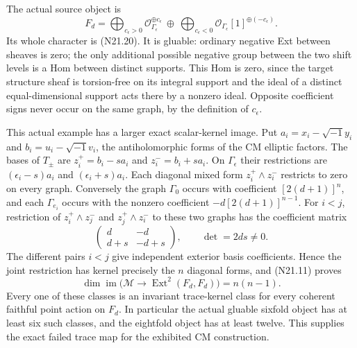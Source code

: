 The actual source object is
\[
 F_d=
 \bigoplus_{c_\epsilon>0}
       \mathcal O_{\Gamma_\epsilon}^{\oplus c_\epsilon}
 \ \oplus\
 \bigoplus_{c_\epsilon<0}
       \mathcal O_{\Gamma_\epsilon}[1]^{\oplus(-c_\epsilon)}.
                                                               \tag{N21.21}
\]
Its whole character is (N21.20). It is gluable:
ordinary negative Ext between sheaves is zero; the only
additional possible negative group between the two shift
levels is a Hom between distinct supports. This Hom is
zero, since the target structure sheaf is torsion-free
on its integral support and the ideal of a distinct
equal-dimensional support acts there by a nonzero ideal.
Opposite coefficient signs never occur on the same
graph, by the definition of $c_\epsilon$.

This actual example has a larger exact scalar-kernel image.
Put $a_i=x_i-\sqrt{-1}y_i$ and $b_i=u_i-\sqrt{-1}v_i$,
the antiholomorphic forms of the CM elliptic factors.
The bases of $T_\pm$ are
$z_i^+=b_i-sa_i$ and $z_i^-=b_i+sa_i$.
On $\Gamma_\epsilon$ their restrictions are
$(\epsilon_i-s)a_i$ and $(\epsilon_i+s)a_i$.
Each diagonal mixed form $z_i^+\wedge z_i^-$ restricts
to zero on every graph. Conversely the graph $\Gamma_0$
occurs with coefficient $[2(d+1)]^n$, and each
$\Gamma_{e_i}$ occurs with the nonzero coefficient
$-d[2(d+1)]^{n-1}$. For $i<j$, restriction of
$z_i^+\wedge z_j^-$ and $z_j^+\wedge z_i^-$ to these
two graphs has the coefficient matrix
\[
              \begin{pmatrix}d&-d\\d+s&-d+s\end{pmatrix},
                    \qquad \det=2ds\ne0.                  \tag{N21.22}
\]
The different pairs $i<j$ give independent exterior
basis coefficients. Hence the joint restriction has
kernel precisely the $n$ diagonal forms, and
(N21.11) proves
\[
 \dim\operatorname{im}
       \bigl(\mathcal M\to\operatorname{Ext}^2(F_d,F_d)\bigr)
                                =n(n-1).                    \tag{N21.23}
\]
Every one of these classes is an invariant trace-kernel
class for every coherent faithful point action on $F_d$.
In particular the actual gluable sixfold object has at
least six such classes, and the eightfold object has at
least twelve. This supplies the exact failed trace map
for the exhibited CM construction.
